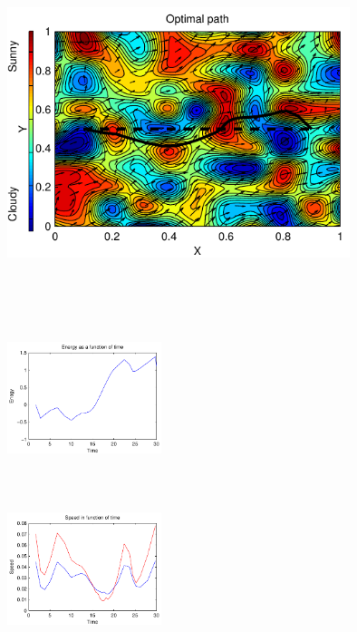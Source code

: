 \begin{figure}[width=15cm]
\begin{minipage}[c][11cm][t]{0.5\textwidth}
  \vspace*{\fill}
  \centering
  \includegraphics[width=10cm,height=10cm]{../src/plot/fancy2/path}
  \label{fig:test21}
\end{minipage}%
\begin{minipage}[c][11cm][t]{.5\textwidth}
  \vspace*{\fill}
  \centering
  \includegraphics[width=4.5cm,height=4.5cm]{../src/plot/fancy2/Energy}
  \label{fig:test22}\par\vfill
  \includegraphics[width=4.5cm,height=4.5cm]{../src/plot/fancy2/speed}

\end{minipage}
\end{figure}
